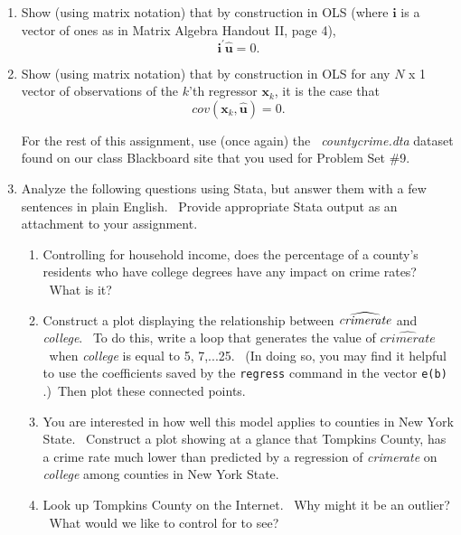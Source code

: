 \documentclass[11pt]{article}
\begin{document}
\begin{enumerate}
\item Show (using matrix notation) that by construction in OLS (where $%
\mathbf{i}$ is a vector of ones as in Matrix Algebra Handout II, page 4), 
\begin{equation*}
\mathbf{i}^{\prime }\widehat{\mathbf{u}}=0.
\end{equation*}

\item Show (using matrix notation) that by construction in OLS for any $N$ x
1 vector of observations of the $k$'th regressor $\mathbf{x}_{k}$, it is the
case that%
\begin{equation*}
cov\left( \mathbf{x}_{k},\widehat{\mathbf{u}}\right) =0.
\end{equation*}%
\bigskip

For the rest of this assignment, use (once again) the \textit{\
countycrime.dta} dataset found on our class Blackboard site that you used
for Problem Set \#9.

\item Analyze the following questions using Stata, but answer them with a
few sentences in plain English. \ Provide appropriate Stata output as an
attachment to your assignment.

\begin{enumerate}
\item Controlling for household income, does the percentage of a county's
residents who have college degrees have any impact on crime rates? \ What is
it?

\item Construct a plot displaying the relationship between $\widehat{\mathit{%
crimerate}}$ and \textit{college}. \ To do this, write a loop that generates
the value of $\widehat{\mathit{crimerate}}$ \ when \textit{college }is equal
to 5, 7,...25. \ (In doing so, you may find it helpful to use the
coefficients saved by the \texttt{regress} command in the vector \texttt{e(b)%
}.)\ Then plot these connected points.

\item You are interested in how well this model applies to counties in New
York State. \ Construct a plot showing at a glance that Tompkins County, has
a crime rate much lower than predicted by a regression of \textit{crimerate}
on \textit{college }among counties in New York State.

\item Look up Tompkins County on the Internet. \ Why might it be an outlier?
\ What would we like to control for to see?\bigskip
\end{enumerate}


\end{enumerate}
\end{document}
